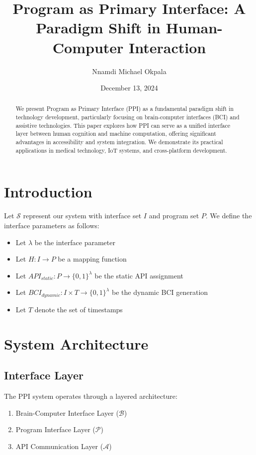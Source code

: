 \documentclass[12pt]{article}
\title{Program as Primary Interface: A Paradigm Shift in Human-Computer Interaction}
\author{Nnamdi Michael Okpala}
\date{December 13, 2024}
\begin{document}
\maketitle

\begin{abstract}
We present Program as Primary Interface (PPI) as a fundamental paradigm shift in technology development, particularly focusing on brain-computer interfaces (BCI) and assistive technologies. This paper explores how PPI can serve as a unified interface layer between human cognition and machine computation, offering significant advantages in accessibility and system integration. We demonstrate its practical applications in medical technology, IoT systems, and cross-platform development.
\end{abstract}

\section{Introduction}
Let $\mathcal{S}$ represent our system with interface set $I$ and program set $P$. We define the interface parameters as follows:
\begin{itemize}
    \item Let $\lambda$ be the interface parameter
    \item Let $H: I \rightarrow P$ be a mapping function
    \item Let $API_{static}: P \rightarrow \{0,1\}^\lambda$ be the static API assignment
    \item Let $BCI_{dynamic}: I \times T \rightarrow \{0,1\}^\lambda$ be the dynamic BCI generation
    \item Let $T$ denote the set of timestamps
\end{itemize}

\section{System Architecture}

\subsection{Interface Layer}
The PPI system operates through a layered architecture:
\begin{enumerate}
    \item Brain-Computer Interface Layer ($\mathcal{B}$)
    \item Program Interface Layer ($\mathcal{P}$)
    \item API Communication Layer ($\mathcal{A}$)
\end{enumerate}
\end{document}
